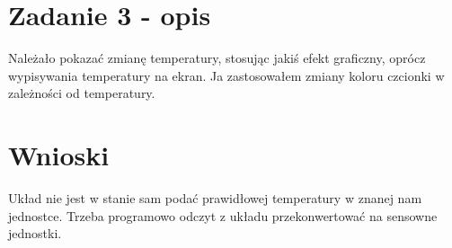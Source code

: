 \documentclass[12pt]{article}
\begin{document}
    \section{Zadanie 3 - opis}
    Należało pokazać zmianę temperatury, stosując jakiś efekt graficzny, oprócz wypisywania temperatury na ekran. Ja zastosowałem zmiany koloru czcionki w zależności od temperatury.
    \newpage

    \section{Wnioski}
    Układ nie jest w stanie sam podać prawidłowej temperatury w znanej nam jednostce. Trzeba programowo odczyt z układu przekonwertować na sensowne jednostki.
\end{document}
